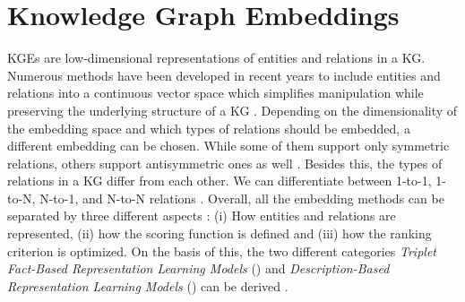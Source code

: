 \section{Knowledge Graph Embeddings} 
\label{sec:knowledge_graph_embeddings}


\acfp{KGE} are low-dimensional representations of entities and relations in a \ac{KG}. 
Numerous methods have been developed in recent years to include entities and relations into a continuous vector
space which simplifies manipulation while preserving the underlying structure of a KG \cite{8047276}.
Depending on the dimensionality of the embedding space and which types of relations should be embedded, a different embedding can be chosen.
While some of them support only symmetric relations, others support antisymmetric ones as well \cite{8047276}. 
Besides this, the types of relations in a \ac{KG} differ from each other.
We can differentiate between 1-to-1, 1-to-N, N-to-1, and N-to-N relations \cite{8047276}.
Overall, all the embedding methods can be separated by three different aspects \cite{electronics9050750}:
(i) How entities and relations are represented, (ii) how the scoring function is defined and (iii) how the ranking criterion is optimized.
On the basis of this, the two different categories 
\textit{Triplet Fact-Based Representation Learning Models} () and \textit{Description-Based Representation Learning Models} () can be derived \cite{electronics9050750}.







